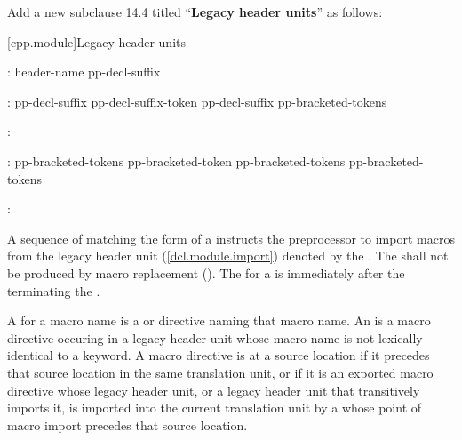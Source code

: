 Add a new subclause 14.4 titled ``\textbf{Legacy header units}'' as follows:

\setcounter{section}{3}
[cpp.module]{Legacy header units}%
\resetalinea[0]

\begin{std.txt}
\color{addclr}
\begin{bnf}
:\br
  \opt{} header-name pp-decl-suffix\opt{} \terminal{;}
\end{bnf}

\begin{bnf}
:\br
  pp-decl-suffix\opt{} pp-decl-suffix-token\br
  pp-decl-suffix\opt{} \terminal{[} pp-bracketed-tokens \terminal{]}
\end{bnf}

\begin{bnf}
:\br
\end{bnf}

\begin{bnf}
:\br
  pp-bracketed-tokens\opt{} pp-bracketed-token\br
  pp-bracketed-tokens\opt{} \terminal{[} pp-bracketed-tokens \terminal{]}
\end{bnf}

\begin{bnf}
:\br
\end{bnf}

\color{addclr}
\alinea
A sequence of  matching the form
of a 
instructs the preprocessor to import macros from the legacy header unit
(\ref{dcl.module.import}) denoted by the .
The \tcode{;}  shall not be produced by
macro replacement ().
The  for a  is
immediately after the \tcode{;} terminating the .

\color{addclr}
\alinea
A  for a macro name is a  or
 directive naming that macro name.
An  is
a macro directive occuring in a legacy header unit
\color{addclr}
whose macro name is not lexically identical to a keyword.
A macro directive is  at a source location
if it precedes that source location in the same translation unit, or
if it is an exported macro directive whose legacy header unit,
or a legacy header unit that
\color{addclr}
transitively imports it,
is imported into the current translation unit by a 
whose point of macro import precedes that source location.


\end{std.txt}
